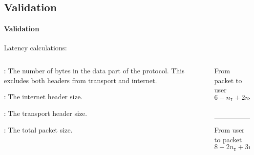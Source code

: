 \begin{frame}[t]
    \frametitle{\EvaluationTitle}
    \subsection{Validation}
    \framesubtitle{Validation}
    Latency calculations:
    \begin{columns}
        \begin{column}{0.60\textwidth}
            \begin{description}[$n_{\mathtt{T}}$]
                \item[$n_{\mathtt{D}}$]:
                The number of bytes in the data part of the protocol. This excludes both
                headers from transport and internet.
                \item[$n_{\mathtt{I}}$]:
                The internet header size.
                \item[$n_{\mathtt{T}}$]:
                The transport header size.
                \item[$n$]:\quad
                The total packet size.
            \end{description}
        \end{column}
        \begin{column}{0.40\textwidth}
            From packet to user
            \begin{equation*}
                6 + n_{\mathtt{I}} + 2n_{\mathtt{T}} + 3n_{\mathtt{D}}
           \end{equation*}\\
           \noindent\rule{8cm}{0.4pt}
           From user to packet
           \begin{equation*}
            8 + 2n_{\mathtt{I}} + 3n_{\mathtt{T}} + 4n_{\mathtt{D}}
            \end{equation*}
        \end{column}
    \end{columns}
    \begin{figure}
        \centering

\end{figure}
\end{frame}

